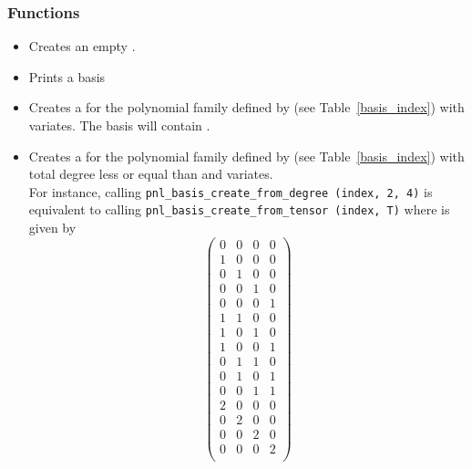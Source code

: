 \subsubsection{Functions}

\begin{itemize}
\item {}
  \sshortdescribe Creates an empty .

\item {}
  \sshortdescribe Prints a basis
  
  
\item {}
  \sshortdescribe Creates a  for the polynomial family
  defined by  (see Table~\ref{basis_index}) with 
  variates. The basis will contain .

\item {}
  \sshortdescribe Creates a  for the polynomial family
  defined by  (see Table~\ref{basis_index}) with total degree less
  or equal than  and  variates.\\
  For instance, calling \verb!pnl_basis_create_from_degree (index, 2, 4)! is
  equivalent to calling \verb!pnl_basis_create_from_tensor (index, T)! where
   is given by
  \[ \left(
    \begin{array}{cccc}
      0 & 0 & 0 & 0\\
      1 & 0 & 0 & 0\\
      0 & 1 & 0 & 0\\
      0 & 0 & 1 & 0\\
      0 & 0 & 0 & 1\\
      1 & 1 & 0 & 0\\
      1 & 0 & 1 & 0\\
      1 & 0 & 0 & 1\\
      0 & 1 & 1 & 0\\
      0 & 1 & 0 & 1\\
      0 & 0 & 1 & 1\\
      2 & 0 & 0 & 0\\
      0 & 2 & 0 & 0\\
      0 & 0 & 2 & 0\\
      0 & 0 & 0 & 2\\
    \end{array}
  \right) \]



\end{itemize}
